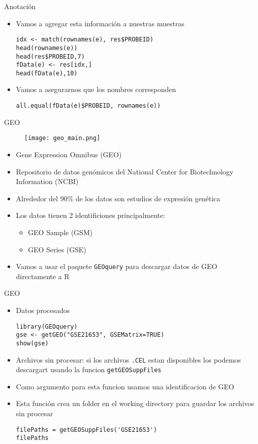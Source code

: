\documentclass{beamer}
\begin{document}
\begin{frame}[fragile]{Anotación}
\begin{itemize}
\item Vamos a agregar esta información a nuestras muestras
\begin{verbatim}
idx <- match(rownames(e), res$PROBEID)
head(rownames(e))
head(res$PROBEID,7)
fData(e) <- res[idx,]
head(fData(e),10)
\end{verbatim}
\item Vamos a asegurarnos que los nombres corresponden
\begin{verbatim}
all.equal(fData(e)$PROBEID, rownames(e))
\end{verbatim}
\end{itemize}
\end{frame}



\begin{frame}[fragile]{GEO}
\begin{figure}[H]
\centering
\texttt{[image: geo\_main.png]}
\end{figure}
\begin{itemize}
\item Gene Expression Omnibus (GEO)
\item Repositorio de datos genómicos del National Center for Biotechnology Information (NCBI)
\item Alrededor del 90\% de los datos son estudios de expresión genética
\item Los datos tienen 2 identificiones principalmente:
\begin{itemize}
\item GEO Sample (GSM)
\item GEO Series (GSE)
\end{itemize} 
\item Vamos a usar el paquete \verb=GEOquery= para descargar datos de GEO directamente a R
\end{itemize}
\end{frame}

\begin{frame}[fragile]{GEO}
\begin{itemize}
\item Datos procesados
\begin{verbatim}
library(GEOquery)
gse <- getGEO("GSE21653", GSEMatrix=TRUE)
show(gse)
\end{verbatim}
\item Archivos sin procesar: si los archivos \verb=.CEL= estan disponibles los podemos descargart usando la funcion \verb=getGEOSuppFiles=
\item Como argumento para esta funcion usamos una identificacion de GEO
\item Esta función crea un folder en el working directory para guardar los archivos sin procesar
\begin{verbatim}
filePaths = getGEOSuppFiles('GSE21653')
filePaths
\end{verbatim}
\end{itemize}
\end{frame}
\end{document}
